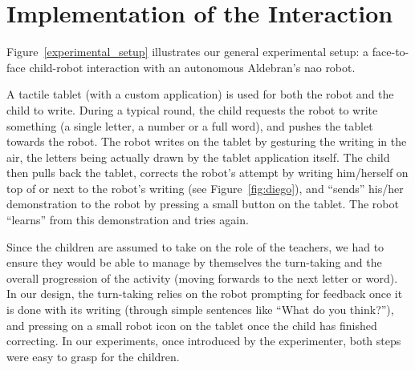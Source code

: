 \documentclass{article}
\begin{document}
\section{Implementation of the Interaction}
\label{impl}

Figure~\ref{experimental_setup} illustrates our general experimental setup: a
face-to-face child-robot interaction with an autonomous Aldebran's {\sc nao}
robot.

A tactile tablet (with a custom application) is used for both the robot and the
child to write. During a typical round, the child requests the robot to write
something (a single letter, a number or a full word), and pushes the tablet
towards the robot. The robot writes on the tablet by gesturing the writing in
the air,  the letters being actually drawn by the tablet application itself. The
child then pulls back the tablet, corrects the robot's attempt by writing
him/herself on top of or next to the robot's writing (see Figure~\ref{fig:diego}),
and ``sends'' his/her demonstration to the robot by pressing a small button on
the tablet. The robot ``learns'' from this demonstration and tries again.

Since the children are assumed to take on the role of the teachers, we had to
ensure they would be able to manage by themselves the turn-taking and the
overall progression of the activity (moving forwards to the next letter or
word). In our design, the turn-taking relies on the robot prompting for feedback
once it is done with its writing (through simple sentences like ``What do you
think?''), and pressing on a small robot icon on the tablet once the child has
finished correcting. In our experiments, once introduced by the
experimenter, both steps were easy to grasp for the children.
\end{document}
